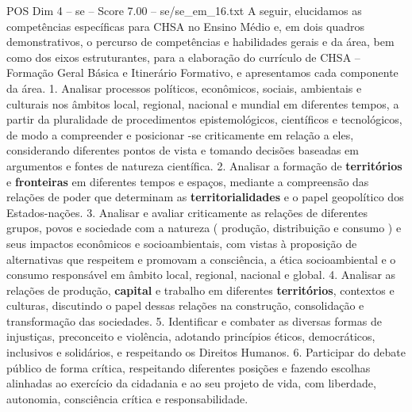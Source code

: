 \begin{textsample}{POS Dim 4 – se – Score 7.00 – se/se\_em\_16.txt}
A seguir, elucidamos as competências específicas para CHSA no Ensino Médio e, em dois quadros demonstrativos, o percurso de competências e habilidades gerais e da área, bem como dos eixos estruturantes, para a elaboração do currículo de CHSA – Formação Geral Básica e Itinerário Formativo, e apresentamos cada componente da área. 1.
Analisar processos políticos, econômicos, sociais, ambientais e culturais nos âmbitos local, regional, nacional e mundial em diferentes tempos, a partir da pluralidade de procedimentos epistemológicos, científicos e tecnológicos, de modo a compreender e posicionar -se criticamente em relação a eles, considerando diferentes pontos de vista e tomando decisões baseadas em argumentos e fontes de natureza científica. 2.
Analisar a formação de \textbf{territórios} e \textbf{fronteiras} em diferentes tempos e espaços, mediante a compreensão das relações de poder que determinam as \textbf{territorialidades} e o papel geopolítico dos Estados-nações. 3.
Analisar e avaliar criticamente as relações de diferentes grupos, povos e sociedade com a natureza ( produção, distribuição e consumo ) e seus impactos econômicos e socioambientais, com vistas à proposição de alternativas que respeitem e promovam a consciência, a ética socioambiental e o consumo responsável em âmbito local, regional, nacional e global. 4.
Analisar as relações de produção, \textbf{capital} e trabalho em diferentes \textbf{territórios}, contextos e culturas, discutindo o papel dessas relações na construção, consolidação e transformação das sociedades. 5.
Identificar e combater as diversas formas de injustiças, preconceito e violência, adotando princípios éticos, democráticos, inclusivos e solidários, e respeitando os Direitos Humanos. 6.
Participar do debate público de forma crítica, respeitando diferentes posições e fazendo escolhas alinhadas ao exercício da cidadania e ao seu projeto de vida, com liberdade, autonomia, consciência crítica e responsabilidade.

\end{textsample}
